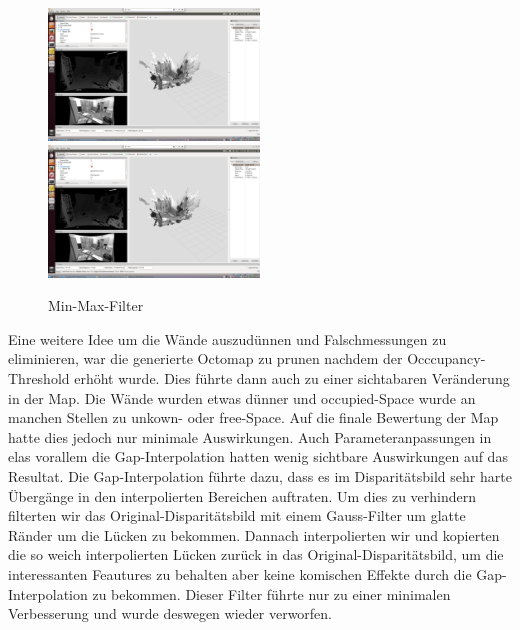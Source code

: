 \documentclass[12pt,titlepage, a4paper]{article}
\begin{document}
\begin{figure}[ht]
 \includegraphics[width=0.5\textwidth]{./jumpEdge/lab_report_je_off.png}
 \includegraphics[width=0.5\textwidth]{./jumpEdge/lab_report_je_on_17.png}
 \caption{Min-Max-Filter}
 \label{Figure 2}
\end{figure}
Eine weitere Idee um die Wände auszudünnen und Falschmessungen zu eliminieren, war die generierte Octomap zu prunen nachdem der Occcupancy-Threshold erhöht wurde. Dies führte dann auch zu einer sichtabaren Veränderung in der Map. Die Wände wurden etwas dünner und occupied-Space wurde an manchen Stellen zu unkown- oder free-Space. Auf die finale Bewertung der Map hatte dies jedoch nur minimale Auswirkungen. Auch Parameteranpassungen in elas vorallem die Gap-Interpolation hatten wenig sichtbare Auswirkungen auf das Resultat. Die Gap-Interpolation führte dazu, dass es im Disparitätsbild sehr harte Übergänge in den interpolierten Bereichen auftraten. Um dies zu verhindern filterten wir das Original-Disparitätsbild mit einem Gauss-Filter um glatte Ränder um die Lücken zu bekommen. Dannach interpolierten wir und kopierten die so weich interpolierten Lücken zurück in das Original-Disparitätsbild, um die interessanten Feautures zu behalten aber keine komischen Effekte durch die Gap-Interpolation zu bekommen. Dieser Filter führte nur zu einer minimalen Verbesserung und wurde deswegen wieder verworfen.
\end{document}

